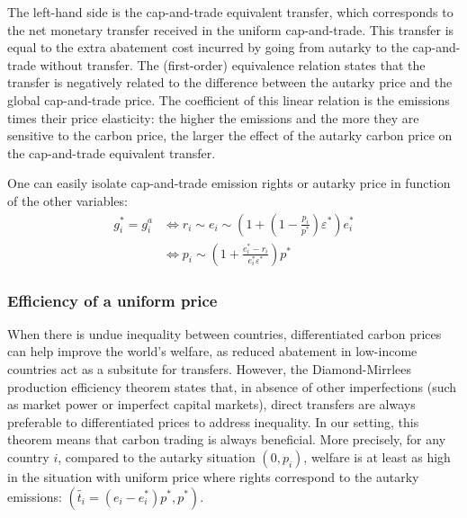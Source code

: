 \documentclass[12pt,english]{article}
\begin{document}
The left-hand side is the cap-and-trade equivalent transfer, which corresponds to the net monetary transfer received in the uniform cap-and-trade. This transfer is equal to the extra abatement cost incurred by going from autarky to the cap-and-trade without transfer. The (first-order) equivalence relation states that the transfer is negatively related to the difference between the autarky price and the global cap-and-trade price. The coefficient of this linear relation is the emissions times their price elasticity: the higher the emissions and the more they are sensitive to the carbon price, the larger the effect of the autarky carbon price on the cap-and-trade equivalent transfer.

One can easily isolate cap-and-trade emission rights or autarky price in function of the other variables: $$\begin{aligned}
g^*_i = g^a_i &\Leftrightarrow r_i \sim e_i \sim (1 + (1 - \frac{p_i}{p^*}) \varepsilon^*) e_i^*  \\
&\Leftrightarrow p_i \sim (1 + \frac{e^*_i - r_i}{e^*_i  \varepsilon^*}) p^*
\end{aligned}$$



\subsubsection*{Efficiency of a uniform price} \label{efficiency-of-a-uniform-price}

When there is undue inequality between countries, differentiated carbon prices can help improve the world's welfare, as reduced abatement in low-income countries act as a subsitute for transfers. However, the Diamond-Mirrlees production efficiency theorem states that, in absence of other imperfections (such as market power or imperfect capital markets), direct transfers are always preferable to differentiated prices to address inequality.\citep{diamond_optimal_1971} In our setting, this theorem means that carbon trading is always beneficial.  
More precisely, for any country $i$, compared to the autarky situation $(0,p_i)$, welfare is at least as high in the situation with uniform price where rights correspond to the autarky emissions: $(\widetilde{t_i}=(e_i - e^*_i)p^* ,p^*)$. 
\end{document}
